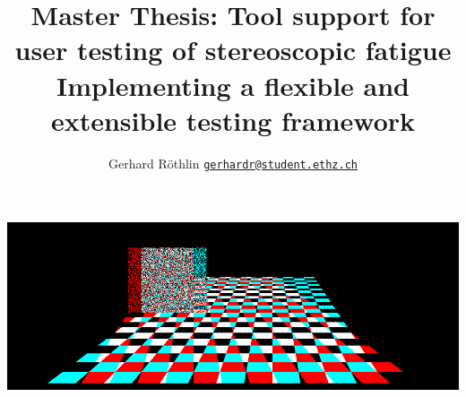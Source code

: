 \documentclass[11pt]{scrartcl}
\title{Master Thesis: Tool support for user testing of stereoscopic fatigue\\
{\large Implementing a flexible and extensible testing framework}}
\author{\normalsize Gerhard R\"othlin 
{\tt  \href{mailto:gerhardr@student.ethz.ch}{gerhardr@student.ethz.ch}}}
\date{}
\begin{document}
\maketitle

\begin{center}
\includegraphics[width=15cm,clip,trim=0cm 0cm 0cm 0cm]{media/title.png}
\end{center}

\end{document}
